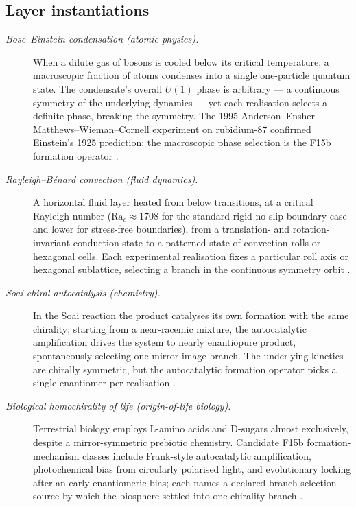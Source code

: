 \documentclass[11pt]{article}
\theoremstyle{definition}
\begin{document}
\subsection*{Layer instantiations}\label{layer-inst:F15b}

\begin{description}
\item[\emph{Bose--Einstein condensation (atomic physics).}]
When a dilute gas of bosons is cooled below its critical
temperature, a macroscopic fraction of atoms condenses into a
single one-particle quantum state.  The condensate's overall
\(U(1)\) phase is arbitrary --- a continuous symmetry of the
underlying dynamics --- yet each realisation selects a definite
phase, breaking the symmetry.  The 1995 Anderson--Ensher--
Matthews--Wieman--Cornell experiment on rubidium-87 confirmed
Einstein's 1925 prediction; the macroscopic phase selection is the
F15b formation operator
\citep{AndersonEnsherMatthewsWiemanCornell1995BEC}.

\item[\emph{Rayleigh--B{\'e}nard convection (fluid dynamics).}]
A horizontal fluid layer heated from below transitions, at a
critical Rayleigh number (\(\mathrm{Ra}_c\approx 1708\) for the
standard rigid no-slip boundary case and lower for stress-free
boundaries), from a translation- and rotation-invariant
conduction state to a patterned state of convection rolls or
hexagonal cells.  Each experimental realisation fixes a particular
roll axis or hexagonal sublattice, selecting a branch in the
continuous symmetry orbit
\citep{Chandrasekhar1961HydrodynamicStability}.

\item[\emph{Soai chiral autocatalysis (chemistry).}]
In the Soai reaction the product catalyses its own formation with
the same chirality; starting from a near-racemic mixture, the
autocatalytic amplification drives the system to nearly
enantiopure product, spontaneously selecting one mirror-image
branch.  The underlying kinetics are chirally symmetric, but the
autocatalytic formation operator picks a single enantiomer per
realisation
\citep{SoaiShibataMoriokaChoji1995AsymmetricAutocatalysis}.

\item[\emph{Biological homochirality of life (origin-of-life
biology).}]
Terrestrial biology employs L-amino acids and D-sugars almost
exclusively, despite a mirror-symmetric prebiotic chemistry.
Candidate F15b formation-mechanism classes include
Frank-style autocatalytic amplification, photochemical bias from
circularly polarised light, and evolutionary locking after an
early enantiomeric bias; each names a declared branch-selection
source by which the biosphere settled into one chirality branch
\citep{Bonner1991OriginAmplificationBiomolecularChirality}.


\end{description}
\end{document}
